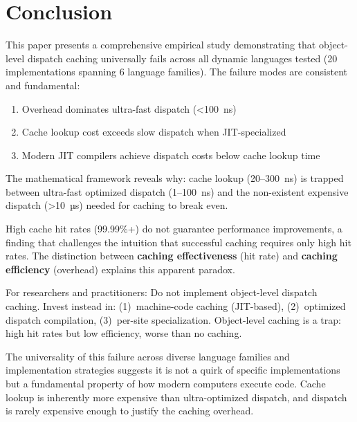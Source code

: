 \documentclass[sigplan,final]{acmart}
\begin{document}
\section{Conclusion}

This paper presents a comprehensive empirical study demonstrating that object-level dispatch
caching universally fails across all dynamic languages tested (20 implementations spanning 6
language families). The failure modes are consistent and fundamental:

\begin{enumerate}
  \item Overhead dominates ultra-fast dispatch (<100~ns)
  \item Cache lookup cost exceeds slow dispatch when JIT-specialized
  \item Modern JIT compilers achieve dispatch costs below cache lookup time
\end{enumerate}

The mathematical framework reveals why: cache lookup (20--300~ns) is trapped between ultra-fast
optimized dispatch (1--100~ns) and the non-existent expensive dispatch (>10~µs) needed for
caching to break even.

High cache hit rates (99.99\%+) do not guarantee performance improvements, a finding that
challenges the intuition that successful caching requires only high hit rates. The distinction
between \textbf{caching effectiveness} (hit rate) and \textbf{caching efficiency} (overhead)
explains this apparent paradox.

For researchers and practitioners: Do not implement object-level dispatch caching. Invest instead in:
(1)~machine-code caching (JIT-based), (2)~optimized dispatch compilation, (3)~per-site specialization.
Object-level caching is a trap: high hit rates but low efficiency, worse than no caching.

The universality of this failure across diverse language families and implementation strategies
suggests it is not a quirk of specific implementations but a fundamental property of how modern
computers execute code. Cache lookup is inherently more expensive than ultra-optimized dispatch,
and dispatch is rarely expensive enough to justify the caching overhead.



\end{document}
